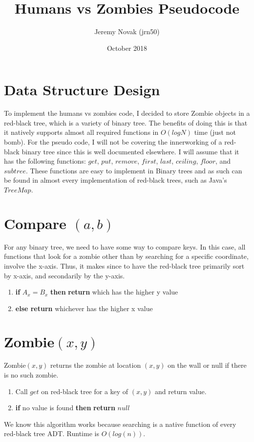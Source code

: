 \documentclass{article}
\title{Humans vs Zombies Pseudocode}
\author{Jeremy Novak (jrn50) }
\date{October 2018}
\begin{document}
\maketitle
\section{Data Structure Design}
To implement the humans vs zombies code, I decided to store Zombie objects in a red-black tree, which is a variety of binary tree. The benefits of doing this is that it natively supports almost all required functions in $O(logN)$ time (just not bomb). For the pseudo code, I will not be covering the innerworking of a red-black binary tree since this is well documented elsewhere. I will assume that it has the following functions: $get$, $put$, $remove$, $first$, $last$, $ceiling$, $floor$, and $subtree$. These functions are easy to implement in Binary trees and as such can be found in almost every implementation of red-black trees, such as Java's $TreeMap$.

\section{Compare $(a,b)$}
For any binary tree, we need to have some way to compare keys. In this case, all functions that look for a zombie other than by searching for a specific coordinate, involve the x-axis. Thus, it makes since to have the red-black tree primarily sort by x-axis, and secondarily by the y-axis.
\begin{enumerate}
    \item \textbf{if} $A_x = B_x$ \textbf{then} \textbf{return} which has the higher y value
    \item \textbf{else return} whichever has the higher x value
\end{enumerate}

\section{Zombie$(x,y)$}
Zombie$(x,y)$  returns  the  zombie  at  location  $(x, y)$  on  the  wall or null if there is no such zombie.
\begin{enumerate}
    \item Call $get$ on red-black tree for a key of  $(x,y)$ and return value. 
    \item \textbf{if} no value is found \textbf{then} \textbf{return} $null$
\end{enumerate}
We know this algorithm works because searching is a native function of every red-black tree ADT. Runtime is $O(log(n))$.
\end{document}
